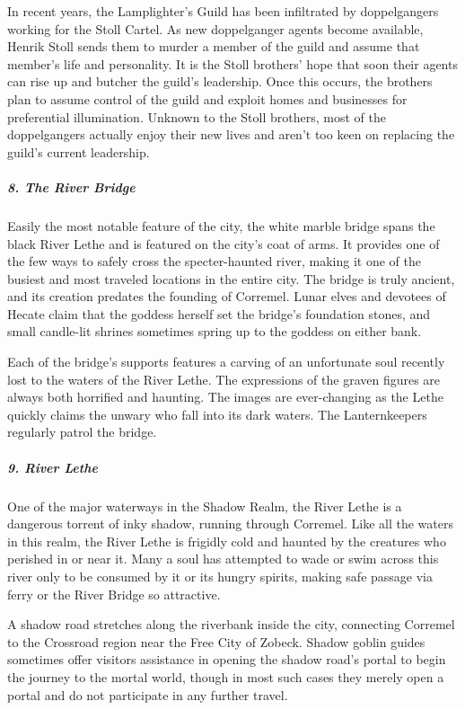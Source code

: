 \documentclass[10pt,a4paper,twoside,bg=print,twocolumn,openany,nodeprecatedcode]{dndbook}
\begin{document}
In recent years, the Lamplighter's Guild has been infiltrated by doppelgangers working for the Stoll Cartel. As new doppelganger agents become available, Henrik Stoll sends them to murder a member of the guild and assume that member's life and personality. It is the Stoll brothers' hope that soon their agents can rise up and butcher the guild's leadership. Once this occurs, the brothers plan to assume control of the guild and exploit homes and businesses for preferential illumination. Unknown to the Stoll brothers, most of the doppelgangers actually enjoy their new lives and aren't too keen on replacing the guild's current leadership.

\subparagraph{8. The River Bridge}
Easily the most notable feature of the city, the white marble bridge spans the black River Lethe and is featured on the city's coat of arms. It provides one of the few ways to safely cross the specter-haunted river, making it one of the busiest and most traveled locations in the entire city. The bridge is truly ancient, and its creation predates the founding of Corremel. Lunar elves and devotees of Hecate claim that the goddess herself set the bridge's foundation stones, and small candle-lit shrines sometimes spring up to the goddess on either bank.

Each of the bridge's supports features a carving of an unfortunate soul recently lost to the waters of the River Lethe. The expressions of the graven figures are always both horrified and haunting. The images are ever-changing as the Lethe quickly claims the unwary who fall into its dark waters. The Lanternkeepers regularly patrol the bridge.

\subparagraph{9. River Lethe}
One of the major waterways in the Shadow Realm, the River Lethe is a dangerous torrent of inky shadow, running through Corremel. Like all the waters in this realm, the River Lethe is frigidly cold and haunted by the creatures who perished in or near it. Many a soul has attempted to wade or swim across this river only to be consumed by it or its hungry spirits, making safe passage via ferry or the River Bridge so attractive.

A shadow road stretches along the riverbank inside the city, connecting Corremel to the Crossroad region near the Free City of Zobeck. Shadow goblin guides sometimes offer visitors assistance in opening the shadow road's portal to begin the journey to the mortal world, though in most such cases they merely open a portal and do not participate in any further travel.
\end{document}

